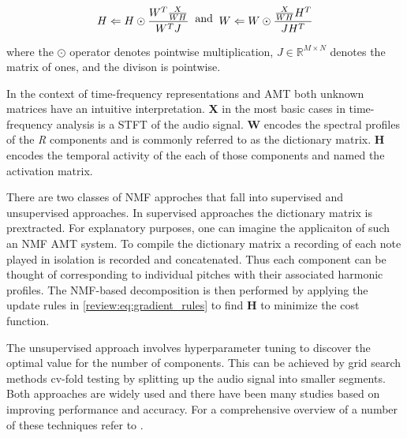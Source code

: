 \begin{equation}
  \begin{split}
    H \Leftarrow H \odot \frac{W^{T}\frac{X}{WH}}{W^{T}J}
  \end{split}
  \text{\;\;and\;\;}
  \begin{split}
    W \Leftarrow W \odot \frac{\frac{X}{WH}H^{T}}{JH^{T}}
  \end{split}
  \label{review:eq:gradient_rules}
\end{equation}

where the $\odot$ operator denotes pointwise multiplication, $J \in
  \mathbb{R}^{M \times N}$ denotes the matrix of ones, and the divison is
pointwise. \cite{amt2019:Benetos}

In the context of time-frequency representations and \ac{AMT} both unknown matrices
have an intuitive interpretation. \textbf{X} in the most basic cases in
time-frequency analysis is a \ac{STFT} of the audio signal. \textbf{W} encodes the
spectral profiles of the \emph{R} components and is commonly referred to as the
dictionary matrix. \textbf{H} encodes the temporal activity of the each of those
components and named the activation matrix.

There are two classes of \ac{NMF} approches that fall into supervised and
unsupervised approaches. In supervised approaches the dictionary matrix is
prextracted. For explanatory purposes, one can imagine the applicaiton of such
an \ac{NMF} \ac{AMT} system. To compile the dictionary matrix a recording of each note
played in isolation is recorded and concatenated. Thus each component can be
thought of corresponding to individual pitches with their associated harmonic
profiles. The \ac{NMF}-based decomposition is then performed by applying the update
rules in \autoref{review:eq:gradient_rules} to find \textbf{H} to minimize the
cost function.

The unsupervised approach involves hyperparameter tuning to discover the optimal
value for the number of components. This can be achieved by grid search methods
cv-fold testing by splitting up the audio signal into smaller segments. Both
approaches are widely used and there have been many studies based on improving
performance and accuracy. For a comprehensive overview of a number of these
techniques refer to \cite{f0estimation2006:Cheveigne,Christensen:2009,
  spmmt:Klapuri}.

